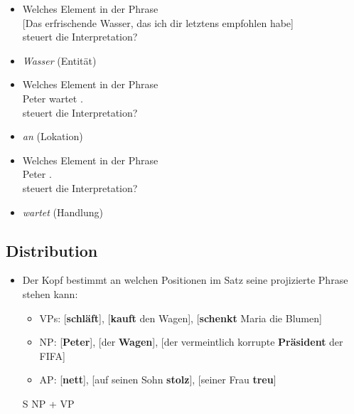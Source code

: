 \begin{frame}

\begin{itemize}
	\item Welches Element in der Phrase\\
	{[}Das erfrischende Wasser, das ich dir letztens empfohlen habe]\\
	steuert die Interpretation?
\pause
	\item[\ra] \emph{Wasser} (Entität)
\pause
	\item Welches Element in der Phrase\\
	Peter wartet .\\
	steuert die Interpretation?
\pause
	\item[\ra] \emph{an} (Lokation)
\pause
	\item Welches Element in der Phrase\\
	Peter .\\
	steuert die Interpretation?
 \pause
	\item[\ra] \emph{wartet} (Handlung)

\end{itemize}

\end{frame}


\subsection{Distribution}

\begin{frame}

\begin{itemize}
	\item Der Kopf bestimmt an welchen Positionen im Satz seine projizierte Phrase stehen kann:
	\begin{itemize}
		\item VPs: [\textbf{schläft}], [\textbf{kauft} den Wagen], [\textbf{schenkt} Maria die Blumen]
		\item NP: [\textbf{Peter}], [der \textbf{Wagen}], [der vermeintlich korrupte \textbf{Präsident} der FIFA]
		\item AP: [\textbf{nett}], [auf seinen Sohn \textbf{stolz}], [seiner Frau \textbf{treu}]
\end{itemize}
	\pause

\eal S \ras NP + VP
\zl
	
	
\end{itemize}

\end{frame}



